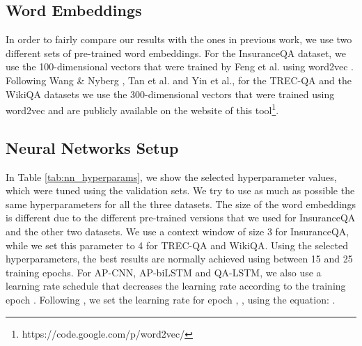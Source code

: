 \documentclass{article}
\begin{document}
\subsection{Word Embeddings}
In order to fairly compare our results with the ones in previous work,
we use two different sets of pre-trained word embeddings.
For the InsuranceQA dataset,
we use the 100-dimensional vectors that were trained by Feng et al.  using word2vec \cite{word2vec2013}.
Following Wang \& Nyberg ,
Tan et al.  and Yin et al.,
for the TREC-QA and the WikiQA datasets we use the 300-dimensional vectors that were trained using word2vec and are publicly available on the website of this tool\footnote{https://code.google.com/p/word2vec/}.

\subsection{Neural Networks Setup}
In Table \ref{tab:nn_hyperparams}, 
we show the selected hyperparameter values, 
which were tuned using the validation sets.
We try to use as much as possible the same hyperparameters for all the three datasets.
The size of the word embeddings is different due to the different pre-trained versions that we used for InsuranceQA and the other two datasets.
We use a context window of size 3 for InsuranceQA,
while we set this parameter to 4 for TREC-QA and WikiQA.
Using the selected hyperparameters,
the best results are normally achieved using between 15 and 25 training epochs.
For AP-CNN,
AP-biLSTM and QA-LSTM,
we also use a learning rate schedule that decreases the learning rate  according to the training epoch .
Following \citet{santos2014},
we set the learning rate for epoch , 
, 
using the equation:
.
\end{document}
